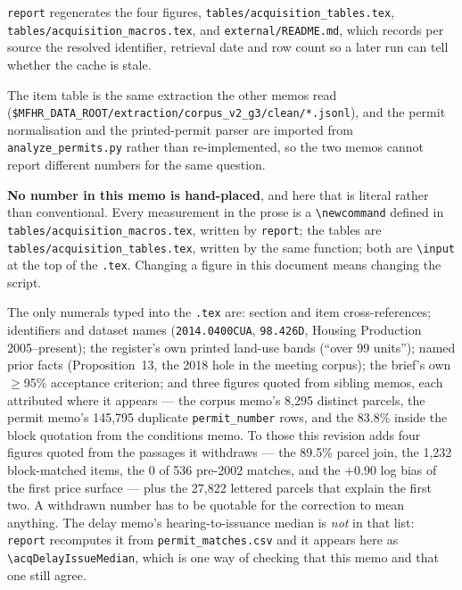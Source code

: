 \documentclass[11pt]{article}
\begin{document}
\texttt{report} regenerates the four figures, \texttt{tables/acquisition\_tables.tex},
\texttt{tables/acquisition\_macros.tex}, and \texttt{external/README.md}, which records per
source the resolved identifier, retrieval date and row count so a later run can tell whether
the cache is stale.

The item table is the same extraction the other memos read
(\texttt{\$MFHR\_DATA\_ROOT/}\allowbreak\texttt{extraction/corpus\_v2\_g3/clean/*.jsonl}),
and the permit
normalisation and the printed-permit parser are imported from
\texttt{analyze\_permits.py} rather than re-implemented, so the two memos cannot report
different numbers for the same question.

\textbf{No number in this memo is hand-placed}, and here that is literal rather than
conventional. Every measurement in the prose is a \texttt{\textbackslash newcommand} defined
in \texttt{tables/acquisition\_macros.tex}, written by \texttt{report}; the tables are
\texttt{tables/acquisition\_tables.tex}, written by the same function; both are
\texttt{\textbackslash input} at the top of the \texttt{.tex}. Changing a figure in this
document means changing the script.

The only numerals typed into the \texttt{.tex} are: section and item cross-references;
identifiers and dataset names (\texttt{2014.0400CUA}, \texttt{98.426D}, Housing
Production 2005--present); the register's own printed land-use bands
(``over 99 units''); named prior facts (Proposition~13, the 2018 hole in the meeting corpus);
the brief's own $\geq$95\% acceptance criterion; and three figures quoted from sibling memos,
each
attributed where it appears --- the corpus memo's 8{,}295 distinct parcels, the permit memo's
145{,}795 duplicate \texttt{permit\_number} rows, and the 83.8\% inside the block quotation
from the conditions memo. To those this revision adds four figures quoted from the passages it
withdraws --- the 89.5\% parcel join, the 1{,}232 block-matched items, the 0 of 536 pre-2002
matches, and the $+0.90$ log bias of the first price surface --- plus the 27{,}822 lettered
parcels that explain the first two. A withdrawn number has to be quotable
for the correction to mean anything. The delay memo's hearing-to-issuance median is \emph{not} in that
list: \texttt{report} recomputes it from \texttt{permit\_matches.csv} and it appears here as
\texttt{\textbackslash acqDelayIssueMedian}, which is one way of checking that this memo and
that one still agree.
\end{document}
